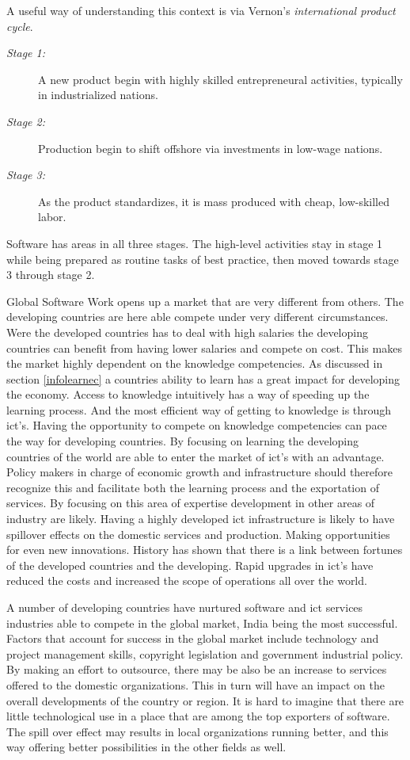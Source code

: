 A useful way of understanding this context is via Vernon's \textit{international product cycle}.
\begin{description}
\item[\textit{Stage 1:}]\hfill
A new product begin with highly skilled entrepreneural activities, typically in industrialized nations.
\item[\textit{Stage 2:}]\hfill
Production begin to shift offshore via investments in low-wage nations.
\item[\textit{Stage 3:}]\hfill
As the product standardizes, it is mass produced with cheap, low-skilled labor.
\end{description}


Software has areas in all three stages. The high-level activities stay in stage 1 while being prepared as routine tasks of best practice, then moved towards stage 3 through stage 2.

Global Software Work opens up a market that are very different from others.
The developing countries are here able compete under very different circumstances.
Were the developed countries has to deal with high salaries the developing countries can benefit from having lower salaries and compete on cost. This makes the market highly dependent on the knowledge competencies. As discussed in section \ref{infolearnec} a countries ability to learn has a great impact for developing the economy. Access to knowledge intuitively has a way of speeding up the learning process. And the most efficient way of getting to knowledge is through \gls{ict}'s. 
Having the opportunity to compete on knowledge competencies can pace the way for developing countries. By focusing on learning the developing countries of the world are able to enter the market of \gls{ict}'s with an advantage. Policy makers in charge of economic growth and infrastructure should therefore recognize this and facilitate both the learning process and the exportation of services. 
By focusing on this area of expertise development in other areas of industry are likely.
Having a highly developed \gls{ict} infrastructure is likely to have spillover effects on the domestic services and production. Making opportunities for even new innovations. 
History has shown that there is a link between fortunes of the developed countries and the developing. Rapid upgrades in \gls{ict}'s have reduced the costs and increased the scope of operations all over the world. 

A number of developing countries have nurtured software and \gls{ict} services industries able to compete in the global market, India being the most successful. 
Factors that account for success in the global market include technology and project management skills, copyright legislation and government industrial policy. By making an effort to outsource, there may be also be an increase to services offered to the domestic organizations. This in turn will have an impact on the overall developments of the country or region. It is hard to imagine that there are little technological use in a place that are among the top exporters of software. The spill over effect may results in local organizations running better, and this way offering better possibilities in the other fields as well.


